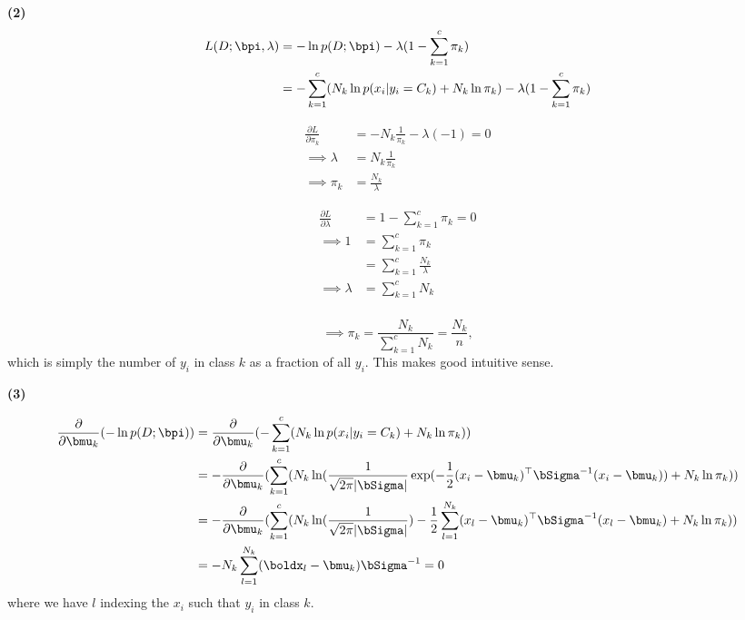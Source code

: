 \documentclass[submit]{harvardml}
\begin{document}
\bigskip

\noindent\textbf{(2)}
\begin{align*}
L(D;\bpi, \lambda) &= -\ln p(D ; \bpi) -\lambda(1-\sum_{k=1}^c \pi_k ) \\
&= -\sum_{k=1}^c(N_k \ln p(x_i | y_i = C_k) + 
N_k \ln \pi_k )  -\lambda(1-\sum_{k=1}^c \pi_k ) \\
\end{align*}

\begin{align*}
\frac{\partial L}{\partial \pi_k} &= - N_k \frac{1}{\pi_k} - \lambda(-1) = 0\\
\implies \lambda &=  N_k \frac{1}{\pi_k} \\
\implies \pi_k &= \frac{N_k}{\lambda}
\end{align*}

\begin{align*}
\frac{\partial L}{\partial \lambda} &= 1 - \sum_{k=1}^c \pi_k = 0\\
\implies 1 &=  \sum_{k=1}^c \pi_k \\
&= \sum_{k=1}^c \frac{N_k}{\lambda}\\
\implies \lambda &= \sum_{k=1}^c N_k\\
\end{align*}

$$\implies \pi_k = \frac{N_k}{\sum_{k=1}^c N_k} = \frac{N_k}{n},$$
which is simply the number of $y_i$ in class $k$ as a fraction of all $y_i$. This makes good intuitive sense. 

\bigskip

\noindent\textbf{(3)} 

\begin{align*}
\frac{\partial}{ \partial \bmu_k } (-\ln p(D ; \bpi)) &=\frac{\partial}{ \partial \bmu_k }( -\sum_{k=1}^c ( N_k \ln p(x_i | y_i = C_k) + N_k \ln \pi_k ))\\
&= - \frac{\partial}{ \partial \bmu_k }(\sum_{k=1}^c (N_k \ln( \frac{1}{\sqrt{2\pi}|\bSigma|} \exp(-\frac{1}{2}(x_i-\bmu_k)^\top \bSigma^{-1}(x_i-\bmu_k)) + N_k \ln \pi_k ))\\
&=  - \frac{\partial}{ \partial \bmu_k }(\sum_{k=1}^c (N_k \ln(\frac{1}{\sqrt{2\pi}|\bSigma|}) -  \frac{1}{2} \sum_{l=1}^{N_k} (x_l-\bmu_k)^\top \bSigma^{-1}(x_l-\bmu_k)+ N_k \ln \pi_k ))\\
&= - N_k \sum_{l=1}^{N_k} (\boldx_l-\bmu_k) \bSigma^{-1} = 0 \\
\end{align*}
where we have $l$ indexing the $x_i$ such that $y_i$ in class $k$. 
\end{document}
